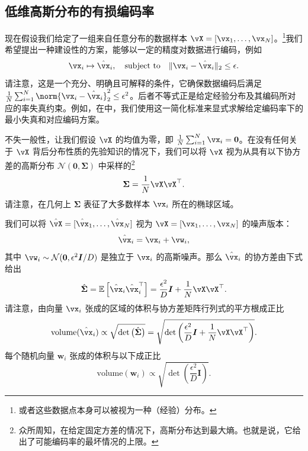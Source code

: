 \documentclass[../../book-main_zh.tex]{subfiles}
\begin{document}
\subsection{低维高斯分布的有损编码率}\label{subsec:lossy DR}
现在假设我们给定了一组来自任意分布的数据样本 $\vX = [\vx_1, \ldots, \vx_N]$。\footnote{或者这些数据点本身可以被视为一种（经验）分布。}我们希望提出一种建设性的方案，能够以一定的精度对数据进行编码，例如
\begin{equation}
    \vx_i \mapsto \hat \vx_i, \quad \mbox{subject to} \quad \|\vx_i -
    \hat \vx_i\|_2 \le \epsilon.
\end{equation}
请注意，这是一个充分、明确且可解释的条件，它确保数据编码后满足 \(\frac{1}{N}\sum_{i = 1}^{N} \norm{\vx_i- \hat \vx_i}_2^{2} \le \epsilon^{2}\)。后者不等式正是给定经验分布及其编码所对应的率失真约束。例如，在中，我们使用这一简化标准来显式求解给定编码率下的最小失真和对应编码方案。

不失一般性，让我们假设 $\vX$ 的均值为零，即 $\frac{1}{N} \sum_{i = 1}^{N} \vx_i = \boldsymbol{0}$。在没有任何关于 $\vX$ 背后分布性质的先验知识的情况下，我们可以将 $\vX$ 视为从具有以下协方差的高斯分布 $\mathcal{N}(\boldsymbol{0}, {\boldsymbol{\Sigma}})$ 中采样的\footnote{众所周知，在给定固定方差的情况下，高斯分布达到最大熵。也就是说，它给出了可能编码率的最坏情况的上限。}
\begin{equation}
    {\boldsymbol{\Sigma}} = \frac{1}{N} \vX\vX^\top.
\end{equation}
请注意，在几何上 ${\boldsymbol{\Sigma}}$ 表征了大多数样本 $\vx_i$ 所在的椭球区域。

我们可以将 $\hat \vX = [\hat \vx_1,\ldots, \hat \vx_N]$ 视为 $\vX = [\vx_1, \ldots, \vx_N]$ 的噪声版本：
\begin{equation}
    \hat \vx_i = \vx_i + \vw_i,
\end{equation}
其中 $\vw_i  \sim
\mathcal{N}(\boldsymbol{0} , {\epsilon^2}  \boldsymbol{I}/{D})$ 是独立于 $\vx_i$ 的高斯噪声。那么 $\hat \vx_i$ 的协方差由下式给出
\begin{equation}
    \hat{\boldsymbol{\Sigma}} = \mathbb{E}\left[\hat \vx_i \hat
    \vx_i^\top\right] = \frac{\epsilon^2}{D} \boldsymbol{I} +
    \frac{1}{N} \vX\vX^\top.
\end{equation}
请注意，由向量 $\vx_i$ 张成的区域的体积与协方差矩阵行列式的平方根成正比
\begin{equation}
    \mbox{volume}(\hat \vx_i) \propto \sqrt{\det
    \big(\hat{\boldsymbol{\Sigma}}\big)} =
    \sqrt{\det\left(\frac{\epsilon^2}{D} \boldsymbol{I} + \frac{1}{N}
    \vX\vX^\top \right)}.
\end{equation}
每个随机向量 $\boldsymbol{w}_i$ 张成的体积与以下成正比
\begin{equation}
    \mbox{volume}(\boldsymbol{w}_i) \propto
    \sqrt{\det\left(\frac{\epsilon^2}{D} \boldsymbol{I} \right)}.
\end{equation}
\end{document}
